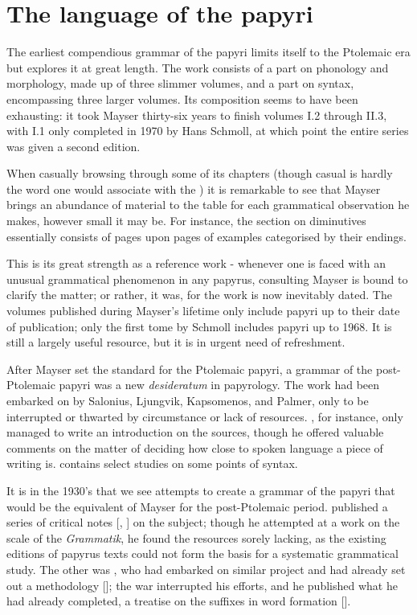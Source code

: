\chapter{The language of the papyri}
\label{chp:printedworks}
The earliest compendious grammar of the papyri limits itself to the Ptolemaic
era but explores it at great length. The work consists of a part on phonology
and morphology, made up of three slimmer volumes, and a part on syntax,
encompassing three larger volumes. Its composition seems to have been
exhausting: it took Mayser thirty-six years to finish volumes I.2 through II.3,
with I.1 only completed in 1970 by Hans Schmoll, at which point the entire
series was given a second edition.

When casually browsing through some of its chapters (though casual is hardly
the word one would associate with the ) it is remarkable to see
that Mayser brings an abundance of material to the table for each grammatical
observation he makes, however small it may be. For instance, the section on
diminutives essentially consists of pages upon pages of examples categorised by
their endings.

This is its great strength as a reference work - whenever one is faced with an
unusual grammatical phenomenon in any papyrus, consulting Mayser is bound to
clarify the matter; or rather, it was, for the work is now inevitably dated.
The volumes published during Mayser's lifetime only include papyri up to their
date of publication; only the first tome by Schmoll includes papyri up to 1968.
It is still a largely useful resource, but it is in urgent need of refreshment.

After Mayser set the standard for the Ptolemaic papyri, a grammar of the
post-Ptolemaic papyri was a new \textit{desideratum} in papyrology. The work
had been embarked on by Salonius, Ljungvik, Kapsomenos, and Palmer, only to be
interrupted or thwarted by circumstance or lack of resources.
\citet{salonius1927}, for instance, only managed to write an introduction on
the sources, though he offered valuable comments on the matter of deciding how
close to spoken language a piece of writing is. \citet{ljungvik1932} contains
select studies on some points of syntax.

It is in the 1930's that we see attempts to create a grammar of the papyri that
would be the equivalent of Mayser for the post-Ptolemaic period.
\citeauthor{kapsomenos1938} published a series of critical notes
[\citeyear{kapsomenos1938}, \citeyear{kapsomenos1957}] on the
subject; though he attempted at a work on the scale of the \textit{Grammatik},
he found the resources sorely lacking, as the existing editions of papyrus
texts could not form the basis for a systematic grammatical study. The other
was \citeauthor{palmer1934}, who had embarked on similar project and had
already set out a methodology [\citeyear{palmer1934}]; the war interrupted his
efforts, and he published what he had already completed, a treatise on the
suffixes in word formation [\citeyear{palmer1945}].


